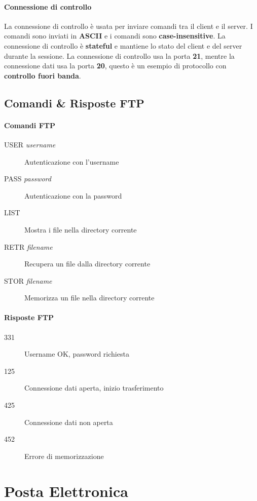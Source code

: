         \paragraph{Connessione di controllo} La connessione di controllo è usata per inviare comandi tra il client e il server. I comandi sono inviati in \textbf{ASCII} e i comandi sono \textbf{case-insensitive}. La connessione di controllo è \textbf{stateful} e mantiene lo stato del client e del server durante la sessione. La connessione di controllo usa la porta \textbf{21}, mentre la connessione dati usa la porta \textbf{20}, questo è un esempio di protocollo con \textbf{controllo fuori banda}.
    \subsection{Comandi \& Risposte FTP}
        \paragraph{Comandi FTP}
            \begin{description}
                \item[USER \textit{username}] Autenticazione con l'username
                \item[PASS \textit{password}] Autenticazione con la password
                \item[LIST] Mostra i file nella directory corrente
                \item[RETR \textit{filename}] Recupera un file dalla directory corrente
                \item[STOR \textit{filename}] Memorizza un file nella directory corrente
            \end{description}
        \paragraph{Risposte FTP}
            \begin{description}
                \item[331] Username OK, password richiesta
                \item[125] Connessione dati aperta, inizio trasferimento
                \item[425] Connessione dati non aperta
                \item[452] Errore di memorizzazione
            \end{description}

\section{Posta Elettronica}
